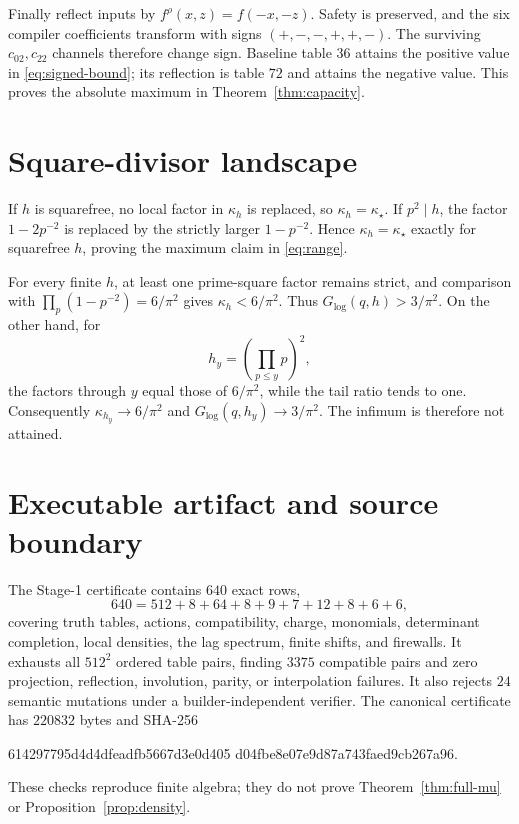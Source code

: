 \documentclass[11pt]{article}
\theoremstyle{definition}
\theoremstyle{remark}
\newcommand{\kap}{\kappa}
\newcommand{\Glog}{G_{\log}}
\begin{document}
Finally reflect inputs by \(f^\rho(x,z)=f(-x,-z)\).  Safety is preserved,
and the six compiler coefficients transform with signs
\((+,-,-,+,+,-)\).  The surviving \(c_{02},c_{22}\) channels therefore
change sign.  Baseline table \(36\) attains the positive value in
\eqref{eq:signed-bound}; its reflection is table \(72\) and attains the
negative value.  This proves the absolute maximum in
Theorem~\ref{thm:capacity}.

\section{Square-divisor landscape}

If \(h\) is squarefree, no local factor in \(\kap_h\) is replaced, so
\(\kap_h=\kap_\star\).  If \(p^2\mid h\), the factor
\(1-2p^{-2}\) is replaced by the strictly larger \(1-p^{-2}\).  Hence
\(\kap_h=\kap_\star\) exactly for squarefree \(h\), proving the maximum
claim in \eqref{eq:range}.

For every finite \(h\), at least one prime-square factor remains strict,
and comparison with \(\prod_p(1-p^{-2})=6/\pi^2\) gives
\(\kap_h<6/\pi^2\).  Thus \(\Glog(q,h)>3/\pi^2\).  On the other hand,
for
\[
 h_y=\left(\prod_{p\le y}p\right)^2,
\]
the factors through \(y\) equal those of \(6/\pi^2\), while the tail ratio
tends to one.  Consequently \(\kap_{h_y}\to6/\pi^2\) and
\(\Glog(q,h_y)\to3/\pi^2\).  The infimum is therefore not attained.

\section{Executable artifact and source boundary}

The Stage-1 certificate contains \(640\) exact rows,
\[
 640=512+8+64+8+9+7+12+8+6+6,
\]
covering truth tables, actions, compatibility, charge, monomials,
determinant completion, local densities, the lag spectrum, finite shifts,
and firewalls.  It exhausts all \(512^2\) ordered table pairs, finding
\(3375\) compatible pairs and zero projection, reflection, involution,
parity, or interpolation failures.  It also rejects \(24\) semantic
mutations under a builder-independent verifier.  The canonical certificate
has \(220832\) bytes and SHA-256
\begin{center}\small\ttfamily
614297795d4d4dfeadfb5667d3e0d405\allowbreak
d04fbe8e07e9d87a743faed9cb267a96.
\end{center}
These checks reproduce finite algebra; they do not prove
Theorem~\ref{thm:full-mu} or Proposition~\ref{prop:density}.
\end{document}
